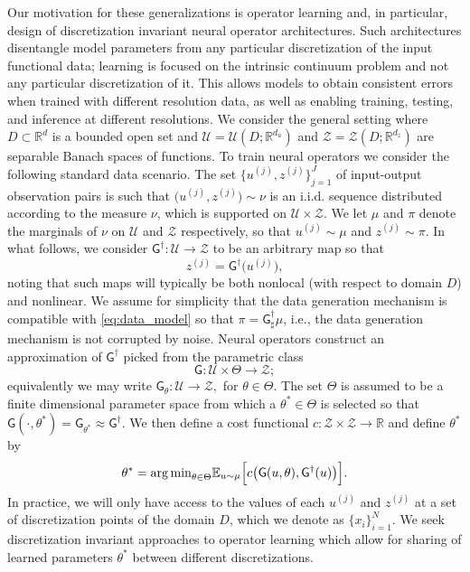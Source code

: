 \documentclass[twoside]{article}
\newcommand{\1}{\mathbbm{1}}
\newcommand{\R}{\mathbbm{R}}
\newcommand{\cU}{\mathcal{U}}
\newcommand{\cZ}{\mathcal{Z}}
\newcommand{\sG}{\mathsf{G}}
\providecommand{\mathbbm}{\mathbb} %
\newcommand{\E}{\mathbb{E}}
\begin{document}
Our motivation for these generalizations is operator learning and, in particular, design of discretization invariant neural operator architectures. Such architectures disentangle model parameters from any particular discretization of the input functional data; learning is focused on the intrinsic 
continuum problem and not any particular discretization of it. This allows models to obtain consistent errors when trained with different resolution data, as well as enabling training, testing, and inference at different resolutions. We consider the general setting where $D\subset \R^d$ is a bounded open set and $\cU=\cU(D;\R^{d_u})$ and $\cZ = \cZ(D;\R^{d_z})$ are separable Banach spaces of functions.
To train neural operators we consider the following standard data scenario. The set $\{u^{(j)}, z^{(j)} \}_{j=1}^J$ of input-output observation pairs is such that $\bigl(u^{(j)},z^{(j)}\bigr)\sim\nu$ is an i.i.d. sequence distributed according to the measure $\nu$, which is supported on $\cU\times \cZ $. We let $\mu$ and $\pi$ denote the marginals of $\nu$ on $\cU$ and $\cZ$ respectively, so that $u^{(j)}\sim \mu$ and $z^{(j)}\sim \pi$. In what follows, we consider $\sG^\dagger:\cU\to\cZ$ to be an arbitrary map so that 
\begin{equation}
\label{eq:data_model}
z^{(j)} = \sG^\dagger\bigl(u^{(j)}\bigr),
\end{equation}
noting that such maps will typically be both nonlocal (with respect to domain $D$) and nonlinear. We
assume for simplicity that the data generation mechanism is compatible with \eqref{eq:data_model} so that $\pi = \sG^\dagger_\sharp \mu$, i.e., the data generation mechanism is not corrupted by noise.  Neural operators construct an approximation of $\sG^\dagger$ picked from the parametric class
$$\sG:\cU\times \Theta \to \cZ;$$
equivalently we may write $\sG_\theta:\cU\to\cZ,$ for $\theta\in\Theta$. The set $\Theta$ is assumed to be a finite dimensional parameter space from which a $\theta^*\in\Theta$ is selected so that $\sG(\cdot,\theta^*) = \sG_{\theta^*}\approx \sG^\dagger$.  We then define a cost functional $c:\cZ\times\cZ\to \R$ and define $\theta^*$ by
\begin{equation}
\label{eq:data_assimilation_model}
\theta^*={\arg \min}_{\theta\in\Theta}\E_{u\sim\mu}\Bigl[ c\bigl(\sG(u,\theta), \sG^\dagger(u) \bigr)\Bigr].
\end{equation}
In practice, we will only have access to the values of each $u^{(j)}$ and $z^{(j)}$ at a set of discretization points of the domain $D$, which we denote as $\{x_i\}_{i=1}^N$. 
We seek discretization invariant approaches to operator learning
which allow for sharing of learned parameters $\theta^*$ between different discretizations.
\end{document}
